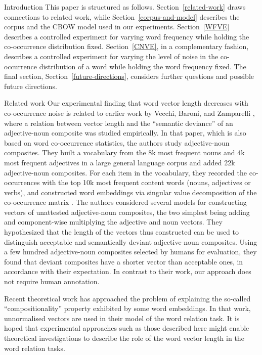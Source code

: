 \documentclass{article} %
\begin{document}
\begin{section}{Introduction}
This paper is structured as follows.  Section~\ref{related-work} draws
connections to related work, while Section~\ref{corpus-and-model} describes
the corpus and the CBOW model used in our experiments.
Section~\ref{WFVE} describes a controlled experiment for varying word
frequency while holding the co-occurrence distribution fixed.
Section~\ref{CNVE}, in a complementary fashion, describes a controlled
experiment for varying the level of noise in the co-occurrence
distribution of a word while holding the word frequency fixed.  The
final section, Section~\ref{future-directions}, considers further questions
and possible future directions.
\end{section}

\begin{section}{Related work}\label{related-work}
Our experimental finding that word vector length decreases with co-occurrence
noise is related to earlier work by Vecchi, Baroni, and Zamparelli
\cite{vecchi-baroni-zamparelli2011}, where a relation between vector length and
the ``semantic deviance'' of an adjective-noun composite was studied
empirically.  In that paper, which is also based on word co-occurrence
statistics, the authors study adjective-noun composites.  They built a
vocabulary from the 8k most frequent nouns and 4k most frequent adjectives in a
large general language corpus and added 22k adjective-noun composites.  For
each item in the vocabulary, they recorded the co-occurrences with the top 10k
most frequent content words (nouns, adjectives or verbs), and constructed word
embeddings via singular value decomposition of the co-occurrence matrix
\cite{landauer-dumais1997}.  The authors considered several models for
constructing vectors of unattested adjective-noun composites, the two simplest
being adding and component-wise multiplying the adjective and noun vectors.
They hypothesized that the length of the vectors thus constructed can be used
to distinguish acceptable and semantically deviant adjective-noun composites.
Using a few hundred adjective-noun composites selected by humans for
evaluation, they found that deviant composites have a shorter vector than
acceptable ones, in accordance with their expectation.  In contrast to their
work, our approach does not require human annotation.

Recent theoretical work \cite{Arora2015} has approached the problem of
explaining the so-called ``compositionality'' property exhibited by some word
embeddings.  In that work, unnormalised vectors are used in their model of the
word relation task.  It is hoped that experimental approaches such as those
described here might enable theoretical investigations to describe the role of
the word vector length in the word relation tasks.  \end{section}
\end{document}
